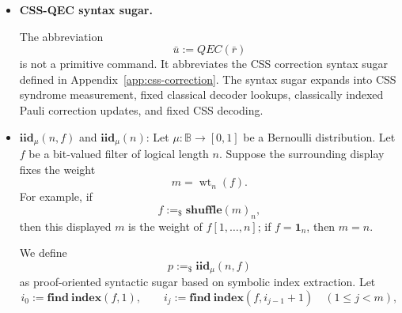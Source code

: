 \documentclass[acmsmall,screen,review,anonymous,nonacm]{acmart}
\theoremstyle{defn_style}
\begin{document}
\begin{itemize}
    The bound \(N\) is a fixed protocol expression. It is written explicitly
    or supplied by the surrounding protocol syntax sugar; it is not inferred by the
    proof system. The expression \(E\) may be a fixed protocol expression or a
    store-dependent expression such as \(\mathbf{length}(g)\).

    A displayed bounded for-loop is admissible under the surrounding symbolic
    context \(\Xi\) only when
    \[
    \Xi\vDash 0\le E\le N
    \]
    and
    \[
    \forall\,1\le t\le N,\qquad
    \operatorname{upd}(S(t))\cap\operatorname{acc}(E)=\emptyset .
    \]
    The first condition bounds the dynamic loop limit by the fixed protocol
    bound. The second condition ensures that the loop bound is stable throughout
    the finite guarded expansion. References inside \(S(t)\) are checked under the
    active-branch guard \(t\le E\).


    The usual fixed-length notation is the special case
    \[
    \mathbf{for}\ i=1\ \mathbf{to}\ i=m
    \quad S(i)
    \quad \mathbf{end}
    \quad\equiv\quad
    \mathbf{for}^{m}\ i=1\ \mathbf{to}\ m
    \quad S(i)
    \quad \mathbf{end}.
    \]
    When \(E=N\), the guards \(t\le E\) are discharged by arithmetic and the
    expansion reduces to
    \[
    S(1);S(2);\cdots;S(N).
    \]
    This construct is not a while-loop and introduces no new semantic rule
    beyond finite sequential composition and conditionals.

    \item \textbf{CSS-QEC syntax sugar.}

    The abbreviation
    \[
    \bar u:=QEC(\bar r)
    \]
    is not a primitive command. It abbreviates the CSS correction syntax sugar
    defined in Appendix~\ref{app:css-correction}. The syntax sugar expands into CSS
    syndrome measurement, fixed classical decoder lookups, classically indexed
    Pauli correction updates, and fixed CSS decoding.

    \item \(\mathbf{iid}_{\mu}(n,f)\) and \(\mathbf{iid}_{\mu}(n)\):
    Let \(\mu:\mathbb B\to[0,1]\) be a Bernoulli distribution. Let \(f\)
    be a bit-valued filter of logical length \(n\). Suppose the surrounding
    display fixes the weight
    \[
    m=\operatorname{wt}_{n}(f).
    \]
    For example, if
    \[
    f:=_{\$}\mathbf{shuffle}(m)_n,
    \]
    then this displayed \(m\) is the weight of \(f[1,\ldots,n]\); if
    \(f=\mathbf 1_n\), then \(m=n\).
    
    We define
    \[
    p:=_{\$}\mathbf{iid}_{\mu}(n,f)
    \]
    as proof-oriented syntactic sugar based on symbolic index extraction. Let
    \[
    i_0:=\mathbf{find~index}(f,1),
    \qquad
    i_j:=\mathbf{find~index}(f,i_{j-1}+1)
    \quad(1\le j<m),
    \]
    

\end{itemize}
\end{document}
